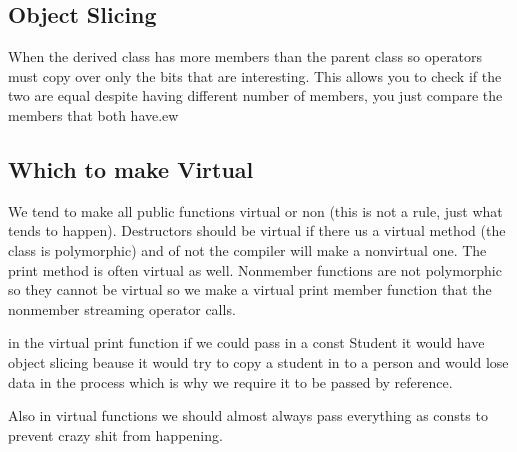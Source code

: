 \documentclass[12pt]{article}
\begin{document}
\subsection*{Object Slicing}
When the derived class has more members than the parent class so operators must copy over only the bits that are interesting. This allows you to check if the two are equal despite having different number of members, you just compare the members that both have.ew

\subsection*{Which to make Virtual}
We tend to make all public functions virtual or non (this is not a rule, just what tends to happen). Destructors should be virtual if there us a virtual method (the class is polymorphic) and of not the compiler will make a nonvirtual one. The print method is often virtual as well. Nonmember functions are not polymorphic so they cannot be virtual so we make a virtual print member function that the nonmember streaming operator calls.

in the virtual print function if we could pass in a const Student it would have object slicing beause it would try to copy a student in to a person and would lose data in the process which is why we require it to be passed by reference.

Also in virtual functions we should almost always pass everything as consts to prevent crazy shit from happening.
\end{document}
